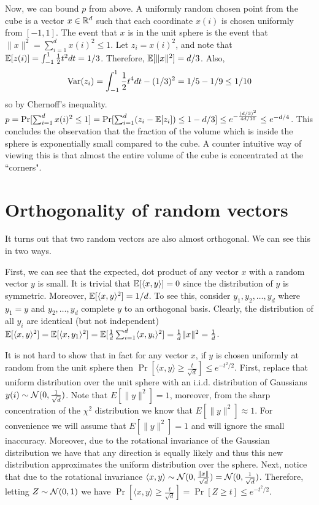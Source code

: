 \documentclass{article}
\begin{document}
Now, we can bound $p$ from above. 
A uniformly random chosen point from the cube is a vector $x \in {\mathbb{R}}^d$ such that each coordinate $x(i)$
is chosen uniformly from $[-1,1]$. The event that $x$ is in the unit sphere is the event that $\|x\|^2 = \sum_{i=1}^{d}x(i)^2 \le 1$.
Let $z_i = x(i)^2$, and note that 
${\mathbb E}[z(i)] = \int_{-1}^{1}\frac{1}{2}t^2 dt = 1/3$. Therefore, ${\mathbb E}[\|x\|^2] = d/3$. 
Also, 
\[
{\operatorname{Var}}(z_i)  = \int_{-1}^{1}\frac{1}{2}t^4 dt  - (1/3)^2  = 1/5 - 1/9 \le 1/10
\]
so by Chernoff's inequality.
$p = \Pr[\sum_{i=1}^{d}x(i)^2 \le 1]  = \Pr[\sum_{i=1}^{d}(z_i -{\mathbb E}[z_i] ) \le 1-d/3] \le e^{-\frac{(d/3)^2}{4d/10}} \le e^{-d/4}$.
This concludes the observation that the fraction of the volume which is inside the sphere is 
exponentially small compared to the cube.
A counter intuitive way of viewing this is that almost the entire volume of the cube is concentrated at the ``corners".

\section{Orthogonality of random vectors}

It turns out that two random vectors are also almost orthogonal.
We can see this in two ways.

First, we can see that the expected, dot product of any vector $x$ with a random vector $y$ is small.
It is trivial that ${\mathbb E}[\langle x,y \rangle] = 0$ since the distribution of $y$ is symmetric.
Moreover, ${\mathbb E}[\langle x,y \rangle^2] = 1/d$.
To see this, consider $y_1,y_2,\ldots,y_d$ where $y_1 = y$ and $y_2,\ldots,y_d$ complete $y$ to an orthogonal basis.
Clearly, the distribution of all $y_i$ are identical (but not independent)
${\mathbb E}[\langle x,y \rangle^2] = {\mathbb E}[\langle x,y_1\rangle^2] = {\mathbb E}[\frac{1}{d}\sum_{i=1}^{d}\langle x,y_i\rangle^2] = \frac{1}{d}\|x\|^2 = \frac{1}{d}$.

It is not hard to show that in fact for any vector $x$, if $y$ is chosen uniformly at random from the unit sphere 
then $\Pr[ \langle x,y \rangle  \ge \frac{t}{\sqrt{d}}] \le e^{-t^2/2}$.
First, replace that uniform distribution over the unit sphere with an i.i.d. distribution of Gaussians $y(i)\sim {\mathcal{N}}(0,\frac{1}{\sqrt{d}})$.
Note that $E[\|y\|^2] = 1$, moreover, from the sharp concentration of the $\chi^2$ distribution we know that $E[\|y\|^2] \approx 1$.
For convenience we will assume that $E[\|y\|^2] = 1$ and will ignore the small inaccuracy.
Moreover, due to the rotational invariance of the Gaussian distribution we have that any direction is equally likely and thus this
new distribution approximates the uniform distribution over the sphere.
Next, notice that due to the rotational invariance $\langle x,y \rangle \sim {\mathcal{N}}(0,\frac{\|x\|}{\sqrt{d}}) = {\mathcal{N}}(0,\frac{1}{\sqrt{d}})$.
Therefore, letting $Z \sim {\mathcal{N}}(0,1)$ we have $\Pr[ \langle x,y \rangle  \ge \frac{t}{\sqrt{d}}] = \Pr[Z \ge t] \le e^{-t^2/2}$.
\end{document}
